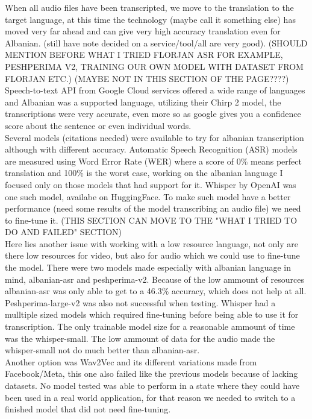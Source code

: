 \documentclass[12pt]{article}
\begin{document}
When all audio files have been transcripted, we move to the translation to the target language, at this time the technology (maybe call it something else) has moved very far ahead and can give very high accuracy translation even for Albanian. (still have note decided on a service/tool/all are very good). 
(SHOULD MENTION BEFORE WHAT I TRIED FLORJAN ASR FOR EXAMPLE, PESHPERIMA V2, TRAINING OUR OWN MODEL WITH DATASET FROM FLORJAN ETC.) (MAYBE NOT IN THIS SECTION OF THE PAGE????)
Speech-to-text API from Google Cloud services offered a wide range of languages and Albanian was a supported language, utilizing their Chirp 2 model, the transcriptions were very accurate, even more so as google gives you a confidence score about the sentence or even individual words.
\\Several models (citations needed) were available to try for albanian transcription although with different accuracy. Automatic Speech Recognition (ASR) models are measured using Word Error Rate (WER) where a score of 0\% means perfect translation and 100\% is the worst case, working on the albanian language I focused only on those models that had support for it. Whisper by OpenAI was one such model, availabe on HuggingFace. To make such model have a better performance (need some results of the model transcribing an audio file) we need to fine-tune it. (THIS SECTION CAN MOVE TO THE "WHAT I TRIED TO DO AND FAILED" SECTION)\\
Here lies another issue with working with a low resource language, not only are there low resources for video, but also for audio which we could use to fine-tune the model. There were two models made especially with albanian language in mind, albanian-asr and peshperima-v2. Because of the low ammount of resources albanian-asr was only able to get to a 46.3\% accuracy, which does not help at all. Peshperima-large-v2 was also not successful when testing. Whisper had a mulltiple sized models which required fine-tuning before being able to use it for transcription. The only trainable model size for a reasonable ammount of time was the whisper-small. The low ammount of data for the audio made the whisper-small not do much better than albanian-asr. \\
Another option was Wav2Vec and its different variations made from Facebook/Meta, this one also failed like the previous models because of lacking datasets. No model tested was able to perform in a state where they could have been used in a real world application, for that reason we needed to switch to a finished model that did not need fine-tuning.\\
\end{document}
